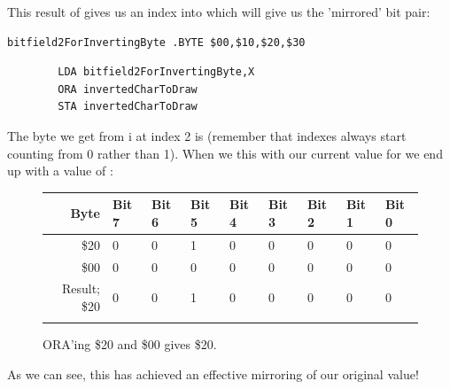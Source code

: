 This result of  gives us an index into  which will
give us the 'mirrored' bit pair:

\begin{lstlisting}
bitfield2ForInvertingByte .BYTE $00,$10,$20,$30
\end{lstlisting}
\begin{lstlisting}
        LDA bitfield2ForInvertingByte,X
        ORA invertedCharToDraw
        STA invertedCharToDraw
\end{lstlisting}

The byte we get from i at index 2 is  (remember that indexes
always start counting from 0 rather than 1). When we  this with our current value for
 we end up with a value of :


\begin{figure}[H]
  {
    \setlength{\tabcolsep}{3.0pt}
    \setlength\cmidrulewidth{\heavyrulewidth} %
    \begin{adjustbox}{width=10cm,center}

      \begin{tabular}{rllllllll}
        \toprule
        Byte & Bit 7 & Bit 6 & Bit 5 & Bit 4 & Bit 3 & Bit 2 & Bit 1 & Bit 0        \\
        \midrule
        \$20 & 0 & 0 & 1 & 0 & 0 & 0 & 0 & 0 \\
        \$00 & 0 & 0 & 0 & 0 & 0 & 0 & 0 & 0 \\
        \midrule
        Result; \$20 & 0 & 0 & 1 & 0 & 0 & 0 & 0 & 0 \\
        \addlinespace
        \bottomrule
      \end{tabular}

    \end{adjustbox}

  }\caption*{ORA'ing \$20 and \$00 gives \$20.}
\end{figure}

As we can see, this has achieved an effective mirroring of our original value!


